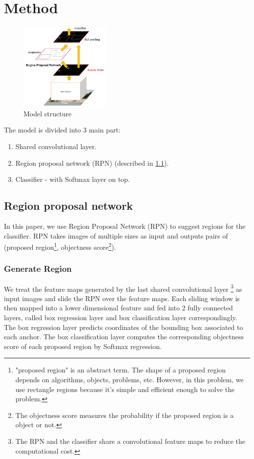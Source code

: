 \documentclass[conference]{IEEEtran}
\begin{document}
\section{Method}
\begin{figure}
	\centering
	\includegraphics[width = 0.4\textwidth]{ModelStructure}
	\caption{Model structure \cite{slidingwin5}}
\end{figure}
The model is divided into 3 main part:
\begin{enumerate}
	\item Shared convolutional layer.
	\item Region proposal network (RPN) (described in \ref{RPN}).
	\item Classifier - with Softmax layer on top.
\end{enumerate}

\subsection{Region proposal network}\label{RPN}
In this paper, we use Region Proposal Network (RPN)\cite{slidingwin5} to suggest regions for the classifier. RPN takes images of multiple sizes as input and outputs pairs of 
(proposed   region\footnote{"proposed region" is an abstract term. The shape of a proposed region depends on algorithms, objects, problems, etc. However, in this problem, we use rectangle regions because it's simple and efficient enough to solve the problem.}, objectness score\footnote{The objectness score measures the probability if the proposed region is a object or not.}).
\subsubsection{Generate Region}
We treat the feature maps generated by the last shared convolutional layer \footnote{The RPN and the classifier share a convolutional feature maps to reduce the computational cost.} as input images and slide the RPN over the feature maps. Each sliding window is then mapped into a lower dimensional feature and fed into 2 fully connected layers, called box regression layer and box classification layer correspondingly. The box regression layer predicts coordinates of the bounding box associated to each anchor. The box classification layer computes the corresponding objectness score of each proposed region by Softmax regression.
\end{document}
